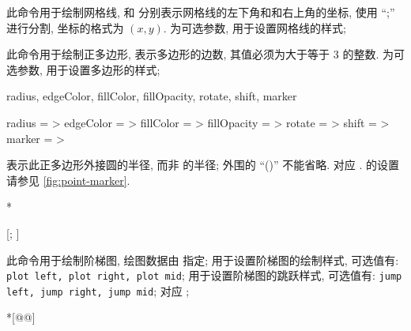 \documentclass[
  hyper, 
  lang = cn, 
  class = l3doc,
  classOption={11pt},
  sect = {load=false},
]{../../zlatex/code/ztex}
\begin{document}
\begin{function}[added=2025-05-15]{\ShowGrid}
  \begin{syntax}
  \end{syntax}
  此命令用于绘制网格线,  和  分别表示网格线的左下角和和右上角的坐标, 使用 ``;'' 进行分割, 
  坐标的格式为 $(x, y)$.  为可选参数, 用于设置网格线的样式;
\end{function}


\begin{function}[added=2025-05-15]{\Polygon}
  \begin{syntax}
  \end{syntax}
  此命令用于绘制正多边形,  表示多边形的边数, 其值必须为大于等于 3 的整数.
   为可选参数, 用于设置多边形的样式;
\end{function}


\begin{keyval}[parent=ztikz/polygon]{
  radius, edgeColor, fillColor, fillOpacity, 
  rotate, shift, marker}
  \begin{syntax}
    radius      = >
    edgeColor   = >
    fillColor   = >
    fillOpacity = >
    rotate      = >
    shift       = >
    marker      = >
  \end{syntax}
   表示此正多边形外接圆的半径, 而非  的半径; 
  外围的 ``()'' 不能省略.  对应 .  的设置
  请参见 \cref{fig:point-marker}.
\end{keyval}
\begin{DocExample}*
\end{DocExample}


\begin{function}[added=2025-05-15]{\StairsPlot}
  \begin{syntax}
    [; ]
    ~~~~~~~~~~~
  \end{syntax}
  此命令用于绘制阶梯图, 绘图数据由  指定;  用于设置阶梯图的绘制样式, 
  可选值有: \texttt{plot left, plot right, plot mid};  用于设置阶梯图的跳跃样式,
  可选值有: \texttt{jump left, jump right, jump mid};  对应 ;
\end{function}
\begin{DocExample}*[@@]
\end{DocExample}
\end{document}
